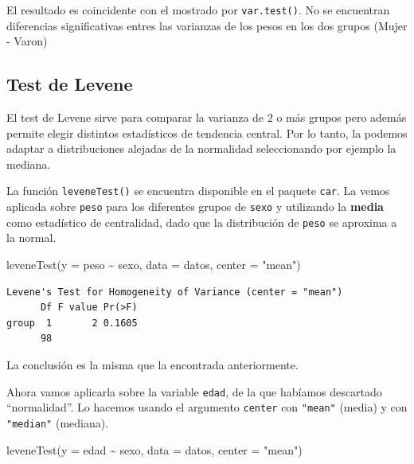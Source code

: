 \documentclass[
  spanish,
  a4paper,
]{scrbook}
\newenvironment{Shaded}{\begin{snugshade}}{\end{snugshade}}
\newcommand{\AttributeTok}[1]{\textcolor[rgb]{0.40,0.45,0.13}{#1}}
\newcommand{\FunctionTok}[1]{\textcolor[rgb]{0.28,0.35,0.67}{#1}}
\newcommand{\NormalTok}[1]{\textcolor[rgb]{0.00,0.23,0.31}{#1}}
\newcommand{\SpecialCharTok}[1]{\textcolor[rgb]{0.37,0.37,0.37}{#1}}
\newcommand{\StringTok}[1]{\textcolor[rgb]{0.13,0.47,0.30}{#1}}
\begin{document}
El resultado es coincidente con el mostrado por \texttt{var.test()}. No
se encuentran diferencias significativas entres las varianzas de los
pesos en los dos grupos (Mujer - Varon)

\subsection{Test de Levene}\label{test-de-levene}

El test de Levene sirve para comparar la varianza de 2 o más grupos pero
además permite elegir distintos estadísticos de tendencia central. Por
lo tanto, la podemos adaptar a distribuciones alejadas de la normalidad
seleccionando por ejemplo la mediana.

La función \texttt{leveneTest()} se encuentra disponible en el paquete
\texttt{car}. La vemos aplicada sobre \texttt{peso} para los diferentes
grupos de \texttt{sexo} y utilizando la \textbf{media} como estadístico
de centralidad, dado que la distribución de \texttt{peso} se aproxima a
la normal.

\begin{Shaded}
\begin{Highlighting}[]
\FunctionTok{leveneTest}\NormalTok{(}\AttributeTok{y =}\NormalTok{ peso }\SpecialCharTok{\textasciitilde{}}\NormalTok{ sexo, }\AttributeTok{data =}\NormalTok{ datos, }\AttributeTok{center =} \StringTok{"mean"}\NormalTok{)}
\end{Highlighting}
\end{Shaded}

\begin{verbatim}
Levene's Test for Homogeneity of Variance (center = "mean")
      Df F value Pr(>F)
group  1       2 0.1605
      98               
\end{verbatim}

La conclusión es la misma que la encontrada anteriormente.

Ahora vamos aplicarla sobre la variable \texttt{edad}, de la que
habíamos descartado ``normalidad''. Lo hacemos usando el argumento
\texttt{center} con \texttt{"mean"} (media) y con \texttt{"median"}
(mediana).

\begin{Shaded}
\begin{Highlighting}[]
\FunctionTok{leveneTest}\NormalTok{(}\AttributeTok{y =}\NormalTok{ edad }\SpecialCharTok{\textasciitilde{}}\NormalTok{ sexo, }\AttributeTok{data =}\NormalTok{ datos, }\AttributeTok{center =} \StringTok{"mean"}\NormalTok{)}
\end{Highlighting}
\end{Shaded}
\end{document}
